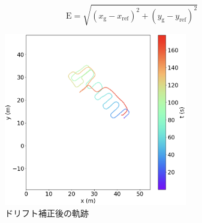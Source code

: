 \vspace{5mm} %
\begin{equation}
	\mathrm{E} = \sqrt{(x_{\mathrm{g}} - x_{\mathrm{ref}})^2 + (y_{\mathrm{g}} - y_{\mathrm{ref}})^2}
\end{equation}
\vspace{5mm} %

\begin{figure}[h]
	\centering
	\includegraphics[width=80mm]{image/pdr-remove-drift-two.jpg}
	\caption{ドリフト補正後の軌跡}    \label{fig:pdr-remove-drift}
\end{figure}
